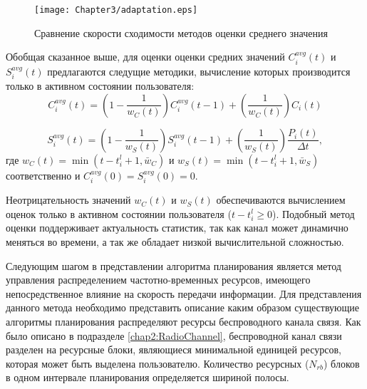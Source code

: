 \begin{figure}[htbp]
\begin{center}
\texttt{[image: Chapter3/adaptation.eps]}
\caption{Сравнение скорости сходимости методов оценки среднего значения}
\label{fig:adaptation}
\end{center}
\end{figure}

Обобщая сказанное выше, для оценки оценки средних значений $C_i^{avg}(t)$ и $S_i^{avg}(t)$ предлагаются следущие методики, вычисление которых производится только в активном состоянии пользователя:
\begin{equation}
\label{eq:CEstimation}
C_i^{avg}(t) = \left(1 - \frac{1}{w_{C}(t)}\right)C_i^{avg}(t - 1) + \left(\frac{1}{w_{C}(t)}\right)C_i(t)
\end{equation}

\begin{equation}
\label{eq:SEstimation}
S_i^{avg}(t) = \left(1 - \frac{1}{w_{S}(t)}\right)S_i^{avg}(t - 1) + \left(\frac{1}{w_{S}(t)}\right)\frac{P_i(t)}{\Delta t},\end{equation}
где $w_{C}(t) = \min (t - t_i^{l} + 1, \bar{w}_{C})$ и $w_{S}(t) = \min (t - t_i^{l} + 1, \bar{w}_{S})$  соответственно и $C_i^{avg}(0) = S_i^{avg}(0) = 0$.

Неотрицательность значений $w_{C}(t)$ и $w_{S}(t)$ обеспечиваются вычислением оценок только в активном состоянии пользователя ($t - t_i^{l} \geq 0$). Подобный метод оценки поддерживает актуальность статистик, так как канал может динамично меняться во времени, а так же обладает низкой вычислительной сложностью.

Следующим шагом в представлении алгоритма планирования является метод управления распределением частотно-временных ресурсов, имеющего непосредственное влияние на скорость передачи информации. Для представления данного метода необходимо представить описание каким образом существующие алгоритмы планирования распределяют ресурсы беспроводного канала связя. Как было описано в подразделе \ref{chap2:RadioChannel}, беспроводной канал связи разделен на ресурсные блоки, являющиеся минимальной единицей ресурсов, которая может быть выделена пользователю. Количество ресурсных ($N_{rb}$) блоков в одном интервале планирования определяется шириной полосы.

